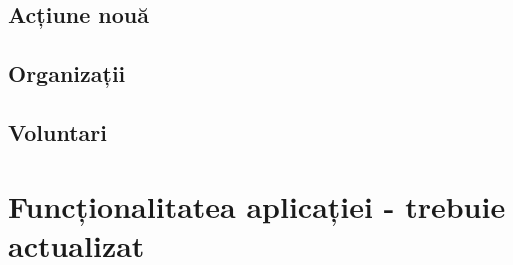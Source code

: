 \documentclass[12pt,a4paper]{report}
\begin{document}
\section{Acțiune nouă}

\section{Organizații}

\section{Voluntari}



\chapter{Funcționalitatea aplicației - trebuie actualizat}
\end{document}
